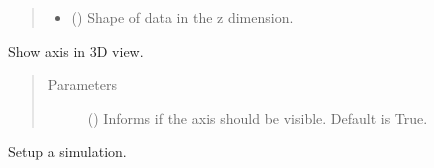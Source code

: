 \documentclass[a4paper,10pt,english]{sphinxmanual}
\begin{document}
\begin{fulllineitems}
\begin{fulllineitems}
\begin{quote}
\begin{description}
\begin{itemize}
\item {} 
 () \textendash{} Shape of data in the z dimension.

\end{itemize}

\end{description}\end{quote}

\end{fulllineitems}


\begin{fulllineitems}
\label{\detokenize{autodoc/mrsprint/mrsprint:mrsprint.mainwindow.MainWindow.setSettingsPath}}
\end{fulllineitems}


\begin{fulllineitems}
\label{\detokenize{autodoc/mrsprint/mrsprint:mrsprint.mainwindow.MainWindow.showAxis3DView}}
Show axis in 3D view.
\begin{quote}\begin{description}
\item[{Parameters}] \leavevmode
{} () \textendash{} Informs if the axis should be visible. Default is True.

\end{description}\end{quote}

\end{fulllineitems}


\begin{fulllineitems}
\label{\detokenize{autodoc/mrsprint/mrsprint:mrsprint.mainwindow.MainWindow.simulate}}
Setup a simulation.

\end{fulllineitems}


\end{fulllineitems}
\end{document}

